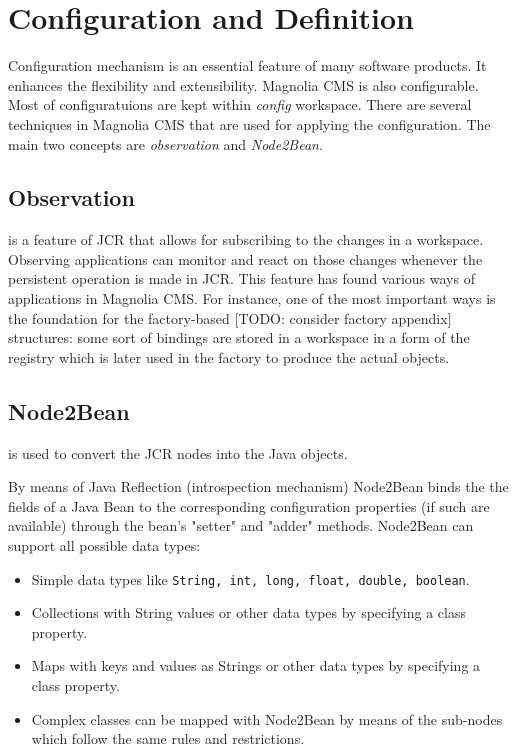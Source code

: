 \section{Configuration and Definition}
Configuration mechanism is an essential feature of many software products. It
enhances the flexibility and extensibility. Magnolia CMS is also configurable.
Most of configuratuions are kept within \emph{config} workspace. There are
several techniques in Magnolia CMS that are used for applying the configuration.
The main two concepts are \emph{observation} and \emph{Node2Bean}.

\subsection{Observation} is a feature of JCR that allows for subscribing to the
changes in a workspace. Observing applications can monitor and react on those
changes whenever the persistent operation is made in JCR. This feature has found
various ways of applications in Magnolia CMS. For instance, one of the most
important ways is the foundation for the factory-based [TODO: consider factory
appendix] structures: some sort of bindings are stored in a workspace in a form
of the registry which is later used in the factory to produce the actual objects.

\subsection{Node2Bean} is used to convert the JCR nodes into the Java objects. 

By means of Java Reflection (introspection mechanism) Node2Bean binds the the
fields of a Java Bean to the corresponding configuration properties (if such are
available) through the bean's "setter" and "adder" methods. Node2Bean can
support all possible data types:
\begin{itemize}
  \item Simple data types like \texttt{String, int, long, float, double, boolean}.
  \item Collections with String values or other data types by specifying a class property.
  \item Maps with keys and values as Strings or other data types by specifying a class property.
  \item Complex classes can be mapped with Node2Bean by means of the sub-nodes
  which follow the same rules and restrictions.
\end{itemize}

